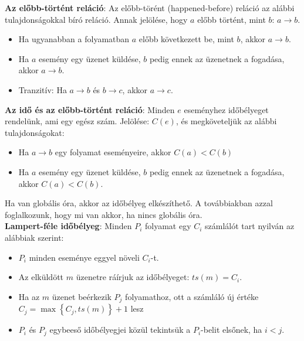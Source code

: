 \documentclass[12pt]{article}
\begin{document}
	\noindent \textbf{Az előbb-történt reláció}: Az előbb-törént (happened-before) reláció az alábbi tulajdonságokkal bíró reláció.
	Annak jelölése, hogy $a$ előbb történt, mint $b$: $a \to b$.
	
	\begin{itemize}
		\item	Ha ugyanabban a folyamatban $a$ előbb következett be, mint $b$, akkor $a \to b$.
		\item	Ha $a$ esemény egy üzenet küldése, $b$ pedig ennek az üzenetnek a fogadása, akkor $a \to b$.
		\item	Tranzitív: Ha $a \to b$ és $b \to c$, akkor $a \to c$.
	\end{itemize}
	
	\noindent \textbf{Az idő és az előbb-történt reláció}: Minden $e$ eseményhez időbélyeget rendelünk, ami egy egész szám. Jelölése:
	$C(e)$, és megköveteljük az alábbi tulajdonságokat:
	
	\begin{itemize}
		\item	Ha $a \to b$ egy folyamat eseményeire, akkor $C(a)<C(b)$
		\item	Ha $a$ esemény egy üzenet küldése, $b$ pedig ennek az üzenetnek a fogadása, akkor $C(a)<C(b)$.
	\end{itemize}
	
	Ha van globális óra, akkor az időbélyeg elkészíthető. A továbbiakban azzal foglalkozunk, hogy mi van akkor, ha nincs globális
	óra.\\
	
	\noindent \textbf{Lampert-féle időbélyeg}: Minden $P_{i}$ folyamat egy $C_{i}$ számlálót tart nyilván az alábbiak szerint:
	\begin{itemize}
		\item	$P_{i}$ minden eseménye eggyel növeli $C_{i}$-t.
		\item	Az elküldött $m$ üzenetre ráírjuk az időbélyeget: $ts(m) = C_{i}$.
		\item	Ha az $m$ üzenet beérkezik $P_{j}$ folyamathoz, ott a számláló új értéke
		$C_{j} = \max \left\{C_{j},ts(m)\right\}+1$ lesz
		\item	$P_{i}$ és $P_{j}$ egybeeső időbélyegjei közül tekintsük a $P_{i}$-belit elsőnek, ha $i<j$.
	\end{itemize}
	
\end{document}
